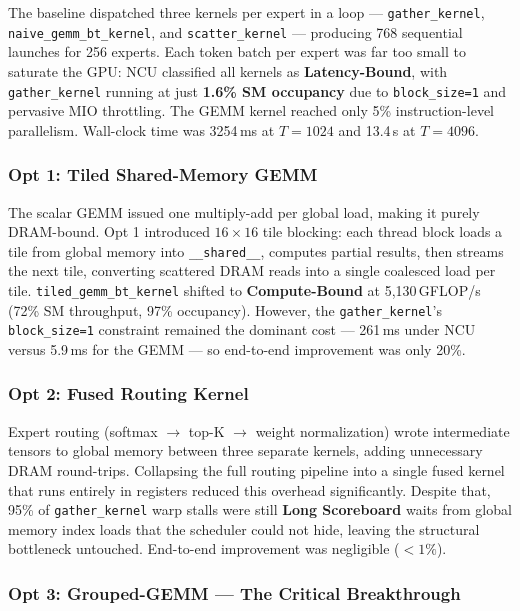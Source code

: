 The baseline dispatched three kernels per expert in a loop — \texttt{gather\_kernel}, \texttt{naive\_gemm\_bt\_kernel}, and \texttt{scatter\_kernel} — producing 768 sequential launches for 256 experts. Each token batch per expert was far too small to saturate the GPU: NCU classified all kernels as \textbf{Latency-Bound}, with \texttt{gather\_kernel} running at just \textbf{1.6\% SM occupancy} due to \texttt{block\_size=1} and pervasive MIO throttling. The GEMM kernel reached only 5\% instruction-level parallelism. Wall-clock time was 3254\,ms at $T=1024$ and 13.4\,s at $T=4096$.

\subsubsection*{Opt 1: Tiled Shared-Memory GEMM}

The scalar GEMM issued one multiply-add per global load, making it purely DRAM-bound. Opt 1 introduced $16\times16$ tile blocking: each thread block loads a tile from global memory into \texttt{\_\_shared\_\_}, computes partial results, then streams the next tile, converting scattered DRAM reads into a single coalesced load per tile. \texttt{tiled\_gemm\_bt\_kernel} shifted to \textbf{Compute-Bound} at 5,130\,GFLOP/s (72\% SM throughput, 97\% occupancy). However, the \texttt{gather\_kernel}'s \texttt{block\_size=1} constraint remained the dominant cost — 261\,ms under NCU versus 5.9\,ms for the GEMM — so end-to-end improvement was only 20\%.

\subsubsection*{Opt 2: Fused Routing Kernel}

Expert routing (softmax $\to$ top-K $\to$ weight normalization) wrote intermediate tensors to global memory between three separate kernels, adding unnecessary DRAM round-trips. Collapsing the full routing pipeline into a single fused kernel that runs entirely in registers reduced this overhead significantly. Despite that, 95\% of \texttt{gather\_kernel} warp stalls were still \textbf{Long Scoreboard} waits from global memory index loads that the scheduler could not hide, leaving the structural bottleneck untouched. End-to-end improvement was negligible ($<1\%$).

\subsubsection*{Opt 3: Grouped-GEMM — The Critical Breakthrough}

